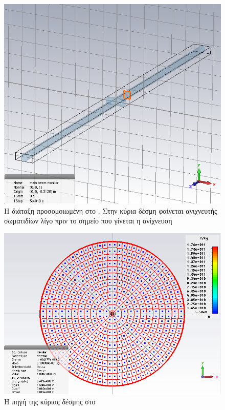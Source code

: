 \begin{figure}[tbh]
\includegraphics[width=\textwidth]{figures/CST-pic-monitor}
\centering
\caption[Η διάταξη προσομοιωμένη στο ]{Η διάταξη προσομοιωμένη στο . 
Στην κύρια δέσμη φαίνεται ανιχνευτής σωματιδίων λίγο πριν το σημείο που γίνεται η ανίχνευση}
\label{fig:CST-PICmonitor}
\end{figure}

\begin{figure}[tbh]
\includegraphics[width=\textwidth]{figures/CST-main-beam-source}
\centering
\caption{Η πηγή της κύριας δέσμης στο }
\label{fig:CST-mainBeamSource}
\end{figure}

